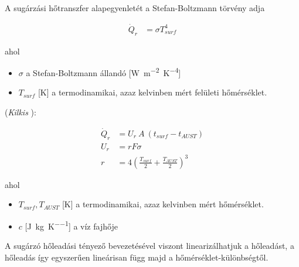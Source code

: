 A sugárzási hőtranszfer alapegyenletét a Stefan-Boltzmann törvény adja


\begin{equation} \label{eq_stefan_boltzmann}
\begin{aligned}
\dot Q_{r} &= \sigma T_{surf}^4
\end{aligned}
\end{equation}

ahol
\begin{itemize}[itemsep=9pt,topsep=0pt,parsep=0pt,partopsep=0pt]
	\item[] $\sigma$ a Stefan-Boltzmann állandó [\si{W~m^{-2}.K^{-4}}] %
	\item[] $T_{surf}$ [\si{\kelvin}] a termodinamikai, azaz kelvinben mért felületi hőmérséklet.
\end{itemize}


(\textit{Kilkis} \cite{KILKIS1994} ):

\begin{equation} \label{eq_radiant_kilkis}
\begin{aligned}
\dot Q_{r} &= U_r ~ A~ \left(t_{surf}-t_{AUST}\right)\\[8pt]
U_r&=rF\sigma\\
r&=4 \left(\frac{T_{surf}}{2}+\frac{T_{AUST}}{2}\right)^3
\end{aligned}
\end{equation}


ahol
\begin{itemize}[itemsep=9pt,topsep=0pt,parsep=0pt,partopsep=0pt]
	\item[] $T_{surf}, T_{AUST}$ [\si{\kelvin}] a termodinamikai, azaz kelvinben mért hőmérséklet.
	\item[] $c$ [\si[per-mode = fraction]{\joule\per\kg\per\kelvin}] a víz fajhője
\end{itemize}

A sugárzó hőleadási tényező bevezetésével viszont linearizálhatjuk a hőleadást, a hőleadás így egyszerűen lineárisan függ majd a hőmérséklet-különbségtől.

